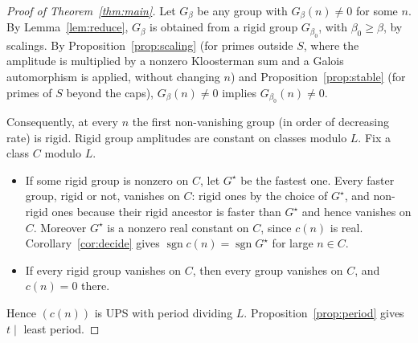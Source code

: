 \documentclass[11pt]{amsart}
\theoremstyle{definition}\newtheorem{definition}[theorem]{Definition}
\theoremstyle{remark}\newtheorem{remark}[theorem]{Remark}
\newcommand{\sgn}{\operatorname{sgn}}\newcommand{\lcm}{\operatorname{lcm}}
\begin{document}
\begin{proof}[Proof of Theorem~\ref{thm:main}]
Let $G_\beta$ be any group with $G_\beta(n)\ne0$ for some $n$. By Lemma~\ref{lem:reduce}, $G_\beta$ is obtained from a rigid group $G_{\beta_0}$, with $\beta_0\ge\beta$, by scalings. By Proposition~\ref{prop:scaling} (for primes outside $S$, where the amplitude is multiplied by a nonzero Kloosterman sum and a Galois automorphism is applied, without changing $n$) and Proposition~\ref{prop:stable} (for primes of $S$ beyond the caps), $G_\beta(n)\ne0$ implies $G_{\beta_0}(n)\ne0$.

Consequently, at every $n$ the first non-vanishing group (in order of decreasing rate) is rigid. Rigid group amplitudes are constant on classes modulo $L$. Fix a class $C$ modulo $L$.
\begin{itemize}[leftmargin=1.5em]
\item If some rigid group is nonzero on $C$, let $G^\star$ be the fastest one. Every faster group, rigid or not, vanishes on $C$: rigid ones by the choice of $G^\star$, and non-rigid ones because their rigid ancestor is faster than $G^\star$ and hence vanishes on $C$. Moreover $G^\star$ is a nonzero real constant on $C$, since $c(n)$ is real. Corollary~\ref{cor:decide} gives $\sgn c(n)=\sgn G^\star$ for large $n\in C$.
\item If every rigid group vanishes on $C$, then every group vanishes on $C$, and $c(n)=0$ there.
\end{itemize}
Hence $(c(n))$ is UPS with period dividing $L$. Proposition~\ref{prop:period} gives $t\mid$ least period.
\end{proof}
\end{document}
